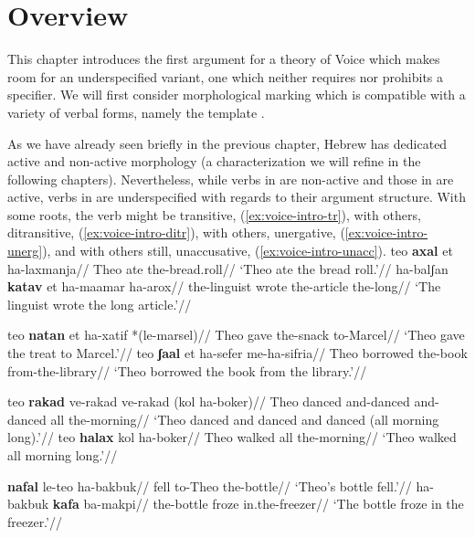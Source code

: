 \label{chap:voice}
\section{Overview} \label{voice:intro}
This chapter introduces the first argument for a theory of Voice which makes room for an underspecified variant, one which neither requires nor prohibits a specifier. We will first consider morphological marking which is compatible with a variety of verbal forms, namely the template {\tkal}.

As we have already seen briefly in the previous chapter, Hebrew has dedicated active and non-active morphology (a characterization we will refine in the following chapters). Nevertheless, while verbs in {\tnif} are non-active and those in {\thif} are active, verbs in {\tkal} are underspecified with regards to their argument structure. With some roots, the verb might be transitive, (\ref{ex:voice-intro-tr}), with others, ditransitive, (\ref{ex:voice-intro-ditr}), with others, unergative, (\ref{ex:voice-intro-unerg}), and with others still, unaccusative, (\ref{ex:voice-intro-unacc}).
\pex\label{ex:voice-intro-tr}
	\a \begingl
		\gla teo \textbf{axal} et ha-laxmanja//
		\glb Theo ate  the-bread.roll//
		\glft `Theo ate the bread roll.'//
	\endgl
	\a \begingl
		\gla ha-balʃan \textbf{katav} et ha-maamar ha-arox//
		\glb the-linguist wrote  the-article the-long//
		\glft `The linguist wrote the long article.'//
	\endgl
\xe

\pex\label{ex:voice-intro-ditr}
	\a \begingl
		\gla teo \textbf{natan} et ha-xatif *(le-marsel)//
		\glb Theo gave  the-snack to-Marcel//
		\glft `Theo gave the treat to Marcel.'//
	\endgl
	\a \begingl
		\gla teo \textbf{ʃaal} et ha-sefer me-ha-sifria//
		\glb Theo borrowed  the-book from-the-library//
		\glft `Theo borrowed the book from the library.'//
	\endgl
\xe

\pex\label{ex:voice-intro-unerg}
	\a \begingl
		\gla teo \textbf{rakad} ve-rakad ve-rakad (kol ha-boker)//
		\glb Theo danced and-danced and-danced all the-morning//
		\glft `Theo danced and danced and danced (all morning long).'//
	\endgl
	\a \begingl
		\gla teo \textbf{halax} kol ha-boker//
		\glb Theo walked all the-morning//
		\glft `Theo walked all morning long.'//
	\endgl
\xe

\pex\label{ex:voice-intro-unacc}
	\a \begingl
		\gla \textbf{nafal} le-teo ha-bakbuk//
		\glb fell to-Theo the-bottle//
		\glft `Theo's bottle fell.'//
	\endgl
	\a \begingl
		\gla ha-bakbuk \textbf{kafa} ba-makpi//
		\glb the-bottle froze in.the-freezer//
		\glft `The bottle froze in the freezer.'//
	\endgl
\xe

